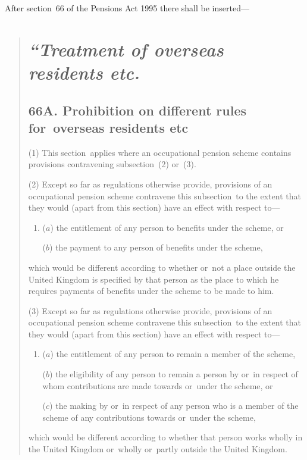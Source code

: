 \documentclass[12pt,a4paper]{article}
\begin{document}
After section~66 of the Pensions Act 1995 there shall be inserted—
\begin{quotation}
\section*{\itshape “Treatment of overseas residents etc.}

\subsection*{66A. Prohibition on different rules for~overseas residents etc}

(1) This section~applies where an occupational pension scheme contains provisions contravening subsection~(2)  or~(3).

(2) Except so far as regulations otherwise provide, provisions of an occupational pension scheme contravene this subsection~to the extent that they would (apart from this section) have an effect with respect to—
\begin{enumerate}\item[]
($a$) the entitlement of any person to benefits under the scheme, or

\begin{sloppypar}
($b$) the payment to any person of benefits under the scheme,
\end{sloppypar}
\end{enumerate}
which would be different according to whether or~not a place outside the United Kingdom is specified by that person as the place to which he requires payments of benefits under the scheme to be made to him.

(3) Except so far as regulations otherwise provide, provisions of an occupational pension scheme contravene this subsection~to the extent that they would (apart from this section) have an effect with respect to—
\begin{enumerate}\item[]
($a$) the entitlement of any person to remain a member of the scheme,

($b$) the eligibility of any person to remain a person by or~in respect of whom contributions are made towards or~under the scheme, or

($c$) the making by or~in respect of any person who is a member of the scheme of any contributions towards or~under the scheme,
\end{enumerate}
which would be different according to whether that person works wholly in the United Kingdom or~wholly or~partly outside the United Kingdom.


\end{quotation}
\end{document}
